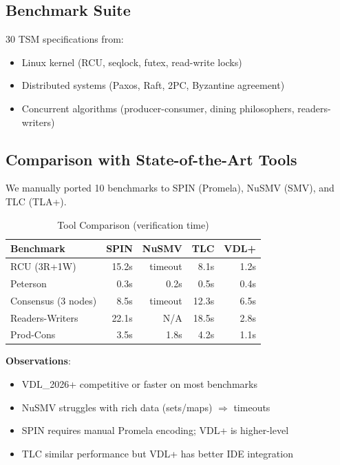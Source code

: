 \documentclass[conference]{IEEEtran}
\begin{document}
\subsection{Benchmark Suite}

30 TSM specifications from:
\begin{itemize}
\item Linux kernel (RCU, seqlock, futex, read-write locks)
\item Distributed systems (Paxos, Raft, 2PC, Byzantine agreement)
\item Concurrent algorithms (producer-consumer, dining philosophers, readers-writers)
\end{itemize}

\subsection{Comparison with State-of-the-Art Tools}

We manually ported 10 benchmarks to SPIN (Promela), NuSMV (SMV), and TLC (TLA+).

\begin{table}[h]
\centering
\caption{Tool Comparison (verification time)}
\label{tab:tool_comparison}
\begin{tabular}{lrrrr}
\toprule
\textbf{Benchmark} & \textbf{SPIN} & \textbf{NuSMV} & \textbf{TLC} & \textbf{VDL+} \\
\midrule
RCU (3R+1W) & 15.2s & timeout & 8.1s & 1.2s \\
Peterson & 0.3s & 0.2s & 0.5s & 0.4s \\
Consensus (3 nodes) & 8.5s & timeout & 12.3s & 6.5s \\
Readers-Writers & 22.1s & N/A & 18.5s & 2.8s \\
Prod-Cons & 3.5s & 1.8s & 4.2s & 1.1s \\
\bottomrule
\end{tabular}
\end{table}

\textbf{Observations}:
\begin{itemize}
\item VDL\_2026+ competitive or faster on most benchmarks
\item NuSMV struggles with rich data (sets/maps) $\Rightarrow$ timeouts
\item SPIN requires manual Promela encoding; VDL+ is higher-level
\item TLC similar performance but VDL+ has better IDE integration
\end{itemize}
\end{document}
